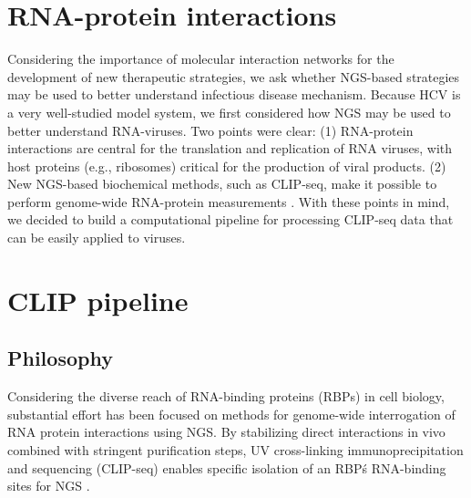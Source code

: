 \section{RNA-protein interactions}

Considering the importance of molecular interaction networks for the development of new therapeutic strategies, we ask whether NGS-based strategies may be used to better understand infectious disease mechanism. Because HCV is a very well-studied model system, we first considered how NGS may be used to better understand RNA-viruses. Two points were clear: (1) RNA-protein interactions are central for the translation and replication of RNA viruses, with host proteins (e.g., ribosomes) critical for the production of viral products. (2) New NGS-based biochemical methods, such as CLIP-seq, make it possible to perform genome-wide RNA-protein measurements \cite{Konig:2012ww}. With these points in mind, we decided to build a computational pipeline for processing CLIP-seq data that can be easily applied to viruses. 
 
\section{CLIP pipeline}

\subsection{Philosophy}

Considering the diverse reach of RNA-binding proteins (RBPs) in cell biology, substantial effort has been focused on methods for genome-wide interrogation of RNA protein interactions using NGS. By stabilizing direct interactions in vivo combined with stringent purification steps, UV cross-linking immunoprecipitation and sequencing (CLIP-seq) enables specific isolation of an RBP\'s RNA-binding sites for NGS \cite{Konig:2012ww}.

